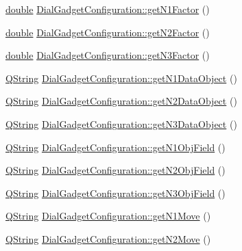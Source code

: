 \begin{DoxyCompactItemize}
\item 
\hyperlink{_super_l_u_support_8h_a8956b2b9f49bf918deed98379d159ca7}{double} \hyperlink{group___dial_plugin_ga760d22b7741ef7b0a7796ccf47779137}{Dial\-Gadget\-Configuration\-::get\-N1\-Factor} ()
\item 
\hyperlink{_super_l_u_support_8h_a8956b2b9f49bf918deed98379d159ca7}{double} \hyperlink{group___dial_plugin_ga89ad791b4b244008b6dfde880dd325bf}{Dial\-Gadget\-Configuration\-::get\-N2\-Factor} ()
\item 
\hyperlink{_super_l_u_support_8h_a8956b2b9f49bf918deed98379d159ca7}{double} \hyperlink{group___dial_plugin_gad5c42344ef84fcb60ca310ba8480a141}{Dial\-Gadget\-Configuration\-::get\-N3\-Factor} ()
\item 
\hyperlink{group___u_a_v_objects_plugin_gab9d252f49c333c94a72f97ce3105a32d}{Q\-String} \hyperlink{group___dial_plugin_ga47479787c12078cbe5a51eed6ce29254}{Dial\-Gadget\-Configuration\-::get\-N1\-Data\-Object} ()
\item 
\hyperlink{group___u_a_v_objects_plugin_gab9d252f49c333c94a72f97ce3105a32d}{Q\-String} \hyperlink{group___dial_plugin_gad43052a508249d44990774c7ec443715}{Dial\-Gadget\-Configuration\-::get\-N2\-Data\-Object} ()
\item 
\hyperlink{group___u_a_v_objects_plugin_gab9d252f49c333c94a72f97ce3105a32d}{Q\-String} \hyperlink{group___dial_plugin_gaecd0eec0153c2fbc4ee5715e8f4eb343}{Dial\-Gadget\-Configuration\-::get\-N3\-Data\-Object} ()
\item 
\hyperlink{group___u_a_v_objects_plugin_gab9d252f49c333c94a72f97ce3105a32d}{Q\-String} \hyperlink{group___dial_plugin_gaf4bf508f606e67bd5355ed00af142027}{Dial\-Gadget\-Configuration\-::get\-N1\-Obj\-Field} ()
\item 
\hyperlink{group___u_a_v_objects_plugin_gab9d252f49c333c94a72f97ce3105a32d}{Q\-String} \hyperlink{group___dial_plugin_ga4a2ae0e302559adb0a0c9e46d885165d}{Dial\-Gadget\-Configuration\-::get\-N2\-Obj\-Field} ()
\item 
\hyperlink{group___u_a_v_objects_plugin_gab9d252f49c333c94a72f97ce3105a32d}{Q\-String} \hyperlink{group___dial_plugin_gaa6a05e10dd1da379ed964050e753d1cf}{Dial\-Gadget\-Configuration\-::get\-N3\-Obj\-Field} ()
\item 
\hyperlink{group___u_a_v_objects_plugin_gab9d252f49c333c94a72f97ce3105a32d}{Q\-String} \hyperlink{group___dial_plugin_ga694808f332bd385339fa07b6aa6ad67b}{Dial\-Gadget\-Configuration\-::get\-N1\-Move} ()
\item 
\hyperlink{group___u_a_v_objects_plugin_gab9d252f49c333c94a72f97ce3105a32d}{Q\-String} \hyperlink{group___dial_plugin_gaa268e84615e3dfe79b2ea85a21015c0f}{Dial\-Gadget\-Configuration\-::get\-N2\-Move} ()

\end{DoxyCompactItemize}
